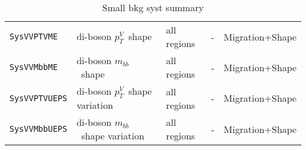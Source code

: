 \begin{table}
{\begin{tabular}{lllll}
      \texttt{SysVVPTVME} & di-boson $p_T^V$\ shape & all regions & - & Migration+Shape \\ 
      \texttt{SysVVMbbME} & di-boson $m_{bb}$\ shape & all regions & - & Migration+Shape \\ 
      \texttt{SysVVPTVUEPS} & di-boson $p_T^V$\ shape variation & all regions & - & Migration+Shape \\
      \texttt{SysVVMbbUEPS} & di-boson $m_{bb}$\ shape variation & all regions & - & Migration+Shape\\
\bottomrule
\end{tabular}
}
\caption{Small bkg syst summary
}
\label{tab:small_bkg_systematics}
\end{table}